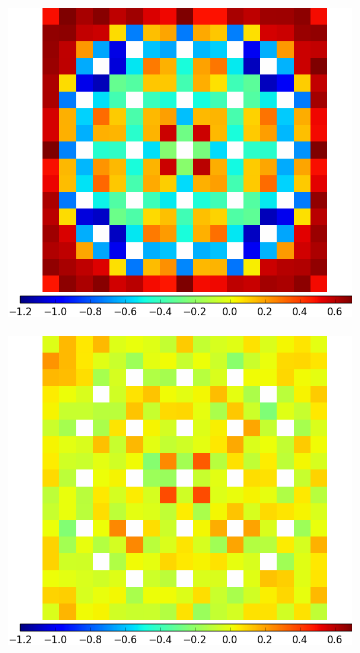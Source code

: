 \begin{figure}[h!]
\centering
\begin{subfigure}{0.45\textwidth}
  \centering
  \includegraphics[width=\linewidth]{figures/results/assm-16/no-transform/capt-err-null}
  \caption{}
  \label{fig:chap11-assm-1.6-capt-null}
\end{subfigure}%
\begin{subfigure}{0.45\textwidth}
  \centering
  \includegraphics[width=\linewidth]{figures/results/assm-16/no-transform/capt-err-degenerate}

\end{subfigure}
\end{figure}
